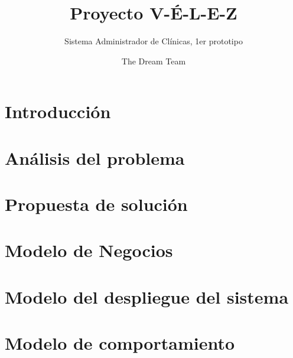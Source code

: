 \documentclass[oneside,10pt]{book}
\title{Proyecto V-\'E-L-E-Z}
\subtitle{Sistema Administrador de Cl\'inicas, 1er prototipo}
\author{The Dream Team}
\begin{document}
\maketitle
\thispagestyle{empty}

\frontmatter
\tableofcontents

\mainmatter

\chapter{Introducción}


\chapter{Análisis del problema}


\chapter{Propuesta de solución}




\chapter{Modelo de Negocios}


\chapter{Modelo del despliegue del sistema}

\chapter{Modelo de comportamiento}
	
\end{document}
